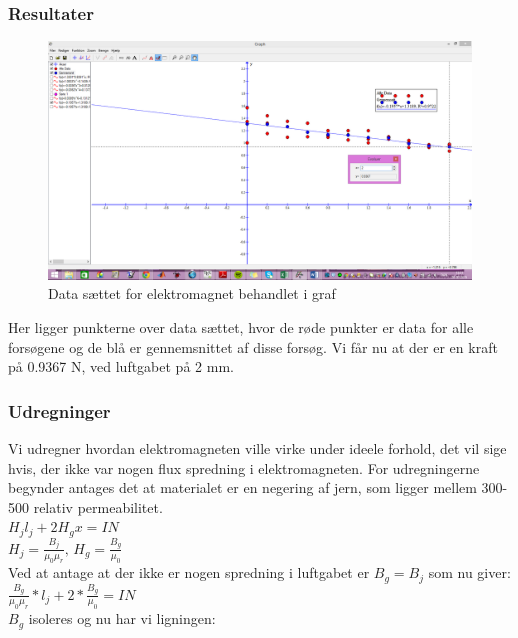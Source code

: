 \subsubsection*{Resultater}
\begin{figure}[h!]
\center
\includegraphics[scale=0.3]{./Graphics/Graf_Elektromagnet_resultater}
\caption{Data sættet for elektromagnet behandlet i graf}
\label{Elektromagnet}
\end{figure}

Her ligger punkterne over data sættet, hvor de røde punkter er data for alle forsøgene og de blå er gennemsnittet af disse forsøg. Vi får nu at der er en kraft på 0.9367 N, ved luftgabet på 2 mm.

\subsubsection*{Udregninger}
Vi udregner hvordan elektromagneten ville virke under ideele forhold, det vil sige hvis, der ikke var nogen flux spredning i elektromagneten. For udregningerne begynder antages det at materialet er en negering af jern, som ligger mellem 300-500 relativ permeabilitet.\\

$H_{j}l_{j}+2H_{g}x=IN$ \\

$H_{j}=\frac{B_{j}}{\mu_{0}\mu_{r}},\,H_{g}=\frac{B_{g}
}{\mu_{0}}$\\

Ved at antage at der ikke er nogen spredning i luftgabet er $B_{g}=B_{j}$ som nu giver:\\

$\frac{B_{g}}{\mu_{0}\mu_{r}}*l_{j}+2*\frac{B_{g}}{\mu_{0}}=IN$\\

$B_{g}$ isoleres og nu har vi ligningen:\\


